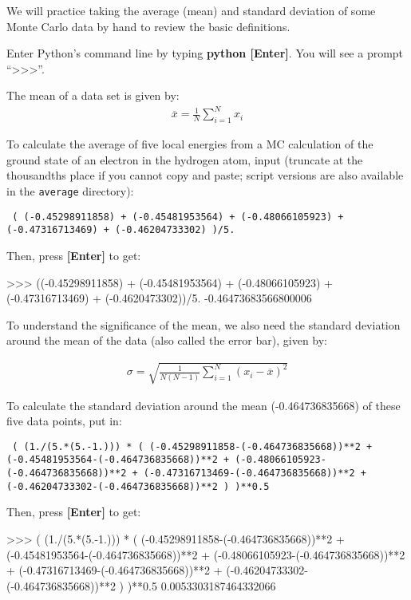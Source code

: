 We will practice taking the average (mean) and standard deviation of some Monte
Carlo data by hand to review the basic definitions.

Enter Python's command line by typing \textbf{python [Enter]}.
You will see a prompt ``\textgreater\textgreater\textgreater''.

The mean of a data set is given by:
\begin{align}
  \overline{x} = \frac{1}{N}\sum_{i=1}^{N} x_i
\end{align}

To calculate the average of five local energies from a MC calculation of the
ground state of an electron in the hydrogen atom, input (truncate at the
thousandths place if you cannot copy and paste; script versions are also
available in the \texttt{average} directory): 

\texttt{
(
(-0.45298911858) + 
(-0.45481953564) + 
(-0.48066105923) + 
(-0.47316713469) + 
(-0.46204733302)
)/5.
} 

Then, press \textbf{[Enter]} to get:

\begin{shade}
>>> ((-0.45298911858) + (-0.45481953564) + (-0.48066105923) + 
(-0.47316713469) + (-0.4620473302))/5.  
-0.46473683566800006
\end{shade}

To understand the significance of the mean, we also need the standard deviation
around the mean of the data (also called the error bar), given by:

\begin{align}
  \sigma = \sqrt{\frac{1}{N(N-1)}\sum_{i=1}^{N} ({x_i} - \overline{x})^2}
\end{align}

To calculate the standard deviation around the mean (-0.464736835668) of these
five data points, put in: 

\texttt{
( (1./(5.*(5.-1.))) * ( 
(-0.45298911858-(-0.464736835668))**2 + \\
(-0.45481953564-(-0.464736835668))**2 + 
(-0.48066105923-(-0.464736835668))**2 + 
(-0.47316713469-(-0.464736835668))**2 + 
(-0.46204733302-(-0.464736835668))**2 ) 
)**0.5
} 

Then, press \textbf{[Enter]} to get:

\begin{shade}
>>> ( (1./(5.*(5.-1.))) * ( (-0.45298911858-(-0.464736835668))**2 +
(-0.45481953564-(-0.464736835668))**2 + (-0.48066105923-(-0.464736835668))**2 + 
(-0.47316713469-(-0.464736835668))**2 + (-0.46204733302-(-0.464736835668))**2 
) )**0.5
0.0053303187464332066
\end{shade}

